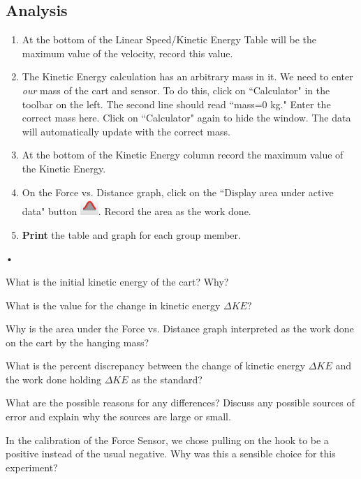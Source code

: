 \documentclass[main.tex]{subfiles}
\begin{document}
\subsection*{Analysis}
\begin{enumerate}
\item
At the bottom of the Linear Speed/Kinetic Energy Table will be the maximum value of the velocity, record this value.
\item
The Kinetic Energy calculation has an arbitrary mass in it. We need to enter \emph{our} mass of the cart and sensor. To do this, click on ``Calculator" in the toolbar on the left. The second line should read ``mass=0 kg." Enter the correct mass here. Click on ``Calculator" again to hide the window. The data will automatically update with the correct mass.
\item
At the bottom of the Kinetic Energy column record the maximum value of the Kinetic Energy.
\item
On the Force vs. Distance graph, click on the ``Display area under active data" button \includegraphics{Area_Under_Curve}. Record the area as the work done.
\item
\textbf{Print} the table and graph for each group member.
\end{enumerate}•

\begin{question}
What is the initial kinetic energy of the cart? Why?
\end{question}
\begin{question}
What is the value for the change in kinetic energy $\Delta KE?$
\end{question}
\begin{question}
Why is the area under the Force vs. Distance graph interpreted as the work done on the cart by the hanging mass?
\end{question}
\begin{question}
What is the percent discrepancy between the change of kinetic energy $\Delta KE$ and the work done holding $\Delta KE$ as the standard?
\end{question}
\begin{question}
What are the possible reasons for any differences? Discuss any possible sources of error and explain why the sources are large or small.
\end{question}
\begin{question}
In the calibration of the Force Sensor, we chose pulling on the hook to be a positive instead of the usual negative. Why was this a sensible choice for this experiment?
\end{question}
\end{document}
